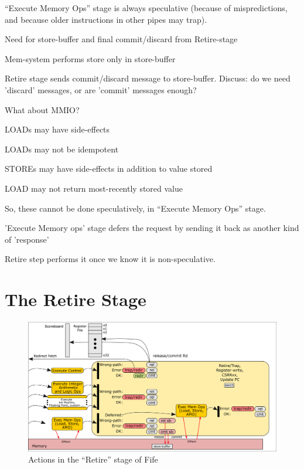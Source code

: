 ``Execute Memory Ops'' stage is always speculative (because of
mispredictions, and because older instructions in other pipes may
trap).

\begin{tightlist}
  \item Need for store-buffer and final commit/discard from Retire-stage
  \item Mem-system performs store only in store-buffer
  \item Retire stage sends commit/discard message to store-buffer.
        Discuss: do we need 'discard' messages, or are 'commit' messages enough?
\end{tightlist}

What about MMIO?

\begin{tightlist}
  \item LOADs may have side-effects
  \item LOADs may not be idempotent
  \item STOREs may have side-effects in addition to value stored
  \item LOAD may not return most-recently stored value
\end{tightlist}

So, these cannot be done speculatively, {\ie} in ``Execute Memory
Ops'' stage.

\begin{tightlist}

  \item 'Execute Memory ops' stage defers the request by sending it
    back as another kind of 'response'

  \item Retire step performs it once we know it is non-speculative.
\end{tightlist}



\section{The Retire Stage}

\label{Sec_Retire_Stage}

\begin{figure}[htbp]
  \centerline{\includegraphics[width=6in,angle=0]{Figures/Fig_Fife_Retire}}
  \caption{\label{Fig_Fife_Retire}Actions in the ``Retire'' stage of Fife}
\end{figure}

